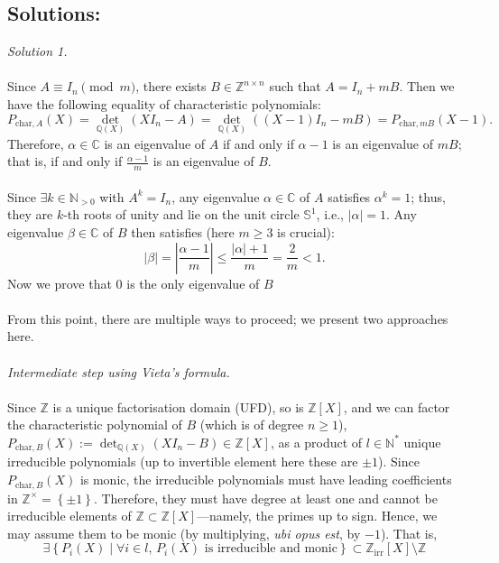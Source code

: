 \documentclass[11pt, a4paper, oneside]{article}
\newcommand{\solution}[1][]{\subsection*{#1}\hfill \par}
\theoremstyle{remark}
\theoremstyle{lemma}
\begin{document}
\solution[Solutions:]
\textit{Solution 1.}
\\\\
Since \( A \equiv I_n \pmod{m} \), there exists \( B \in \mathbb{Z}^{n \times n} \) such that \( A = I_n + mB \). Then we have the following equality of characteristic polynomials:
\[
P_{\text{char},A}(X) = {\det}_{\mathbb{Q}(X)}\left(XI_n - A\right) = {\det}_{\mathbb{Q}(X)}\left(\left(X - 1\right)I_n - mB\right) = P_{\text{char},mB}\left(X - 1\right).
\]
Therefore, \( \alpha \in \mathbb{C} \) is an eigenvalue of \( A \) if and only if \( \alpha - 1 \) is an eigenvalue of \( mB \); that is, if and only if \( \frac{\alpha - 1}{m} \) is an eigenvalue of \( B \).
\\\\
Since \( \exists k \in \mathbb{N}_{>0}\) with \(A^k = I_n \), any eigenvalue \( \alpha \in \mathbb{C} \) of \( A \) satisfies \( \alpha^k = 1 \); thus, they are \( k \)-th roots of unity and lie on the unit circle \( \mathbb{S}^{1} \), i.e., \( \left|\alpha\right| = 1 \). Any eigenvalue \( \beta \in \mathbb{C} \) of \( B \) then satisfies (here \( m \geq 3 \) is crucial):
\[
\left|\beta\right| = \left| \frac{\alpha - 1}{m} \right| \leq \frac{\left|\alpha\right| + 1}{m} = \frac{2}{m} < 1.
\]
Now we prove that \( 0 \) is the only eigenvalue of \( B \)
\\\\
From this point, there are multiple ways to proceed; we present two approaches here.
\\\\
\textit{Intermediate step using Vieta’s formula.}
\\\\
Since \( \mathbb{Z} \) is a unique factorisation domain (UFD), so is \( \mathbb{Z}[X] \), and we can factor the characteristic polynomial of \( B \) (which is of degree \( n \geq 1 \)), \( P_{\text{char},B}(X) := \det_{\mathbb{Q}(X)}\left(XI_n - B\right) \in \mathbb{Z}[X] \), as a product of \( l \in \mathbb{N}^{*} \) unique irreducible polynomials (up to invertible element here these are $\pm1$). Since \( P_{\text{char},B}(X) \) is monic, the irreducible polynomials must have leading coefficients in \( \mathbb{Z}^{\times} = \left\{\pm 1\right\} \). Therefore, they must have degree at least one and cannot be irreducible elements of \( \mathbb{Z} \subset \mathbb{Z}[X] \)—namely, the primes up to sign. Hence, we may assume them to be monic (by multiplying, \textit{ubi opus est}, by \( -1 \)). That is,
\[
\exists \left\{P_i(X) \mid \forall i \in l,\, P_i(X) \text{ is irreducible and monic} \right\} \subset \mathbb{Z}_{\text{irr}}[X] \setminus \mathbb{Z}
\]
\end{document}
